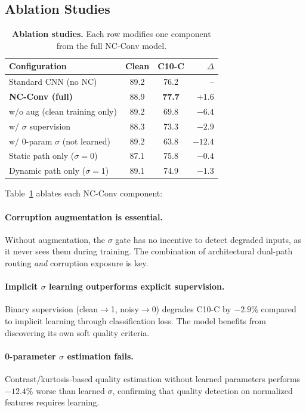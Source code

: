 \documentclass[10pt,twocolumn,letterpaper]{article}
\begin{document}
\subsection{Ablation Studies}
\label{sec:ablation}

\begin{table}[t]
\centering
\caption{\textbf{Ablation studies.} Each row modifies one component from the full NC-Conv model.}
\label{tab:ablation}
\footnotesize
\begin{tabular}{@{}lcc r@{}}
\toprule
\textbf{Configuration} & \textbf{Clean} & \textbf{C10-C} & $\Delta$ \\
\midrule
Standard CNN (no NC) & 89.2 & 76.2 & -- \\
\midrule
\textbf{NC-Conv (full)} & 88.9 & \textbf{77.7} & $+1.6$ \\
\quad w/o aug (clean training only) & 89.2 & 69.8 & $-6.4$ \\
\quad w/ $\sigma$ supervision & 88.3 & 73.3 & $-2.9$ \\
\quad w/ 0-param $\sigma$ (not learned) & 89.2 & 63.8 & $-12.4$ \\
\quad Static path only ($\sigma{=}0$) & 87.1 & 75.8 & $-0.4$ \\
\quad Dynamic path only ($\sigma{=}1$) & 89.1 & 74.9 & $-1.3$ \\
\bottomrule
\end{tabular}
\end{table}

Table~\ref{tab:ablation} ablates each NC-Conv component:

\paragraph{Corruption augmentation is essential.}
Without augmentation, the $\sigma$ gate has no incentive to detect degraded inputs, as it never sees them during training.
The combination of architectural dual-path routing \emph{and} corruption exposure is key.

\paragraph{Implicit $\sigma$ learning outperforms explicit supervision.}
Binary supervision (clean$\to$1, noisy$\to$0) degrades C10-C by $-2.9\%$ compared to implicit learning through classification loss.
The model benefits from discovering its own soft quality criteria.

\paragraph{0-parameter $\sigma$ estimation fails.}
Contrast/kurtosis-based quality estimation without learned parameters performs $-12.4\%$ worse than learned $\sigma$, confirming that quality detection on normalized features requires learning.
\end{document}
